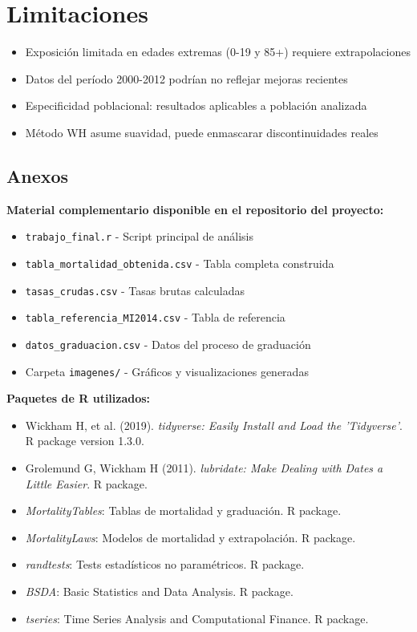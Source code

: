 
\section{Limitaciones}

\begin{itemize}
    \item Exposición limitada en edades extremas (0-19 y 85+) requiere extrapolaciones
    \item Datos del período 2000-2012 podrían no reflejar mejoras recientes
    \item Especificidad poblacional: resultados aplicables a población analizada
    \item Método WH asume suavidad, puede enmascarar discontinuidades reales
\end{itemize}
\subsection*{Anexos}

\textbf{Material complementario disponible en el repositorio del proyecto:}

\begin{itemize}
    \item \texttt{trabajo\_final.r} - Script principal de análisis
    \item \texttt{tabla\_mortalidad\_obtenida.csv} - Tabla completa construida
    \item \texttt{tasas\_crudas.csv} - Tasas brutas calculadas
    \item \texttt{tabla\_referencia\_MI2014.csv} - Tabla de referencia
    \item \texttt{datos\_graduacion.csv} - Datos del proceso de graduación
    \item Carpeta \texttt{imagenes/} - Gráficos y visualizaciones generadas
\end{itemize}

\textbf{Paquetes de R utilizados:}
\begin{itemize}
    \item Wickham H, et al. (2019). \textit{tidyverse: Easily Install and Load the 'Tidyverse'}. R package version 1.3.0.
    \item Grolemund G, Wickham H (2011). \textit{lubridate: Make Dealing with Dates a Little Easier}. R package.
    \item \textit{MortalityTables}: Tablas de mortalidad y graduación. R package.
    \item \textit{MortalityLaws}: Modelos de mortalidad y extrapolación. R package.
    \item \textit{randtests}: Tests estadísticos no paramétricos. R package.
    \item \textit{BSDA}: Basic Statistics and Data Analysis. R package.
    \item \textit{tseries}: Time Series Analysis and Computational Finance. R package.
\end{itemize}

